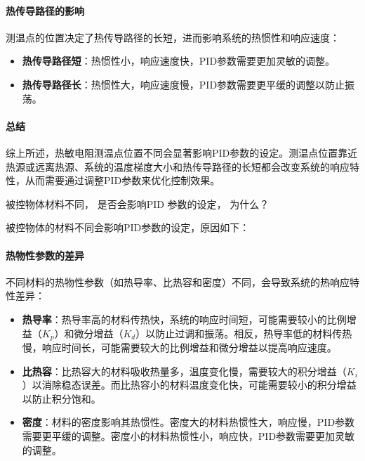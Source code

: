 \documentclass[dvipsnames, svgnames,a4paper,11pt]{article}
\begin{document}
\paragraph*{热传导路径的影响}

测温点的位置决定了热传导路径的长短，进而影响系统的热惯性和响应速度：

\begin{itemize}
    \item \textbf{热传导路径短}：热惯性小，响应速度快，PID参数需要更加灵敏的调整。
    \item \textbf{热传导路径长}：热惯性大，响应速度慢，PID参数需要更平缓的调整以防止振荡。
\end{itemize}

\paragraph*{总结}

综上所述，热敏电阻测温点位置不同会显著影响PID参数的设定。测温点位置靠近热源或远离热源、系统的温度梯度大小和热传导路径的长短都会改变系统的响应特性，从而需要通过调整PID参数来优化控制效果。




\begin{question}
	被控物体材料不同， 是否会影响PID 参数的设定， 为什么？
\end{question}



被控物体的材料不同会影响PID参数的设定，原因如下：

\paragraph*{热物性参数的差异}

不同材料的热物性参数（如热导率、比热容和密度）不同，会导致系统的热响应特性差异：

\begin{itemize}
    \item \textbf{热导率}：热导率高的材料传热快，系统的响应时间短，可能需要较小的比例增益（$K_p$）和微分增益（$K_d$）以防止过调和振荡。相反，热导率低的材料传热慢，响应时间长，可能需要较大的比例增益和微分增益以提高响应速度。
    \item \textbf{比热容}：比热容大的材料吸收热量多，温度变化慢，需要较大的积分增益（$K_i$）以消除稳态误差。而比热容小的材料温度变化快，可能需要较小的积分增益以防止积分饱和。
    \item \textbf{密度}：材料的密度影响其热惯性。密度大的材料热惯性大，响应慢，PID参数需要更平缓的调整。密度小的材料热惯性小，响应快，PID参数需要更加灵敏的调整。
\end{itemize}
\end{document}
